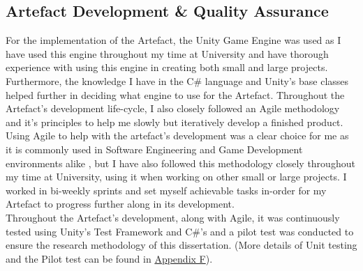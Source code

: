 \subsection{Artefact Development \& Quality Assurance} 
For the implementation of the Artefact, the Unity Game Engine \cite{unity} was used as I have used this engine throughout my time at University and have thorough experience with using this engine in creating both small and large projects. Furthermore, the knowledge I have in the C\# language and Unity's base classes helped further in deciding what engine to use for the Artefact.
Throughout the Artefact's development life-cycle, I also closely followed an Agile methodology and it's principles to help me slowly but iteratively develop a finished product. Using Agile to help with the artefact's development was a clear choice for me as it is commonly used in Software Engineering and Game Development environments alike \cite{game-dev-agile}, but I have also followed this methodology closely throughout my time at University, using it when working on other small or large projects. I worked in bi-weekly sprints and set myself achievable tasks in-order for my Artefact to progress further along in its development.
\\
Throughout the Artefact's development, along with Agile, it was continuously tested using Unity's Test Framework \cite{unit-unit-testing} and C\#'s \cite{nunit-framework} and a pilot test was conducted to ensure the research methodology of this dissertation. (More details of Unit testing and the Pilot test can be found in \hyperref[append:f]{Appendix F}).